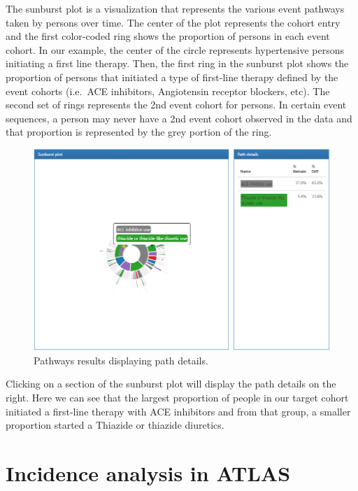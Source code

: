 \documentclass[11pt]{book}
\theoremstyle{definition}
\theoremstyle{definition}
\theoremstyle{definition}
\theoremstyle{remark}
\begin{document}
The sunburst plot is a visualization that represents the various event pathways taken by persons over time. The center of the plot represents the cohort entry and the first color-coded ring shows the proportion of persons in each event cohort. In our example, the center of the circle represents hypertensive persons initiating a first line therapy. Then, the first ring in the sunburst plot shows the proportion of persons that initiated a type of first-line therapy defined by the event cohorts (i.e.~ACE inhibitors, Angiotensin receptor blockers, etc). The second set of rings represents the 2nd event cohort for persons. In certain event sequences, a person may never have a 2nd event cohort observed in the data and that proportion is represented by the grey portion of the ring.

\begin{figure}

{\centering \includegraphics[width=1\linewidth]{images/Characterization/atlasPathwaysResultsPathDetails} 

}

\caption{Pathways results displaying path details.}\label{fig:atlasPathwaysResultsPathDetails}
\end{figure}

Clicking on a section of the sunburst plot will display the path details on the right. Here we can see that the largest proportion of people in our target cohort initiated a first-line therapy with ACE inhibitors and from that group, a smaller proportion started a Thiazide or thiazide diuretics.

\hypertarget{incidence-analysis-in-atlas}{%
\section{Incidence analysis in ATLAS}\label{incidence-analysis-in-atlas}}
\end{document}
